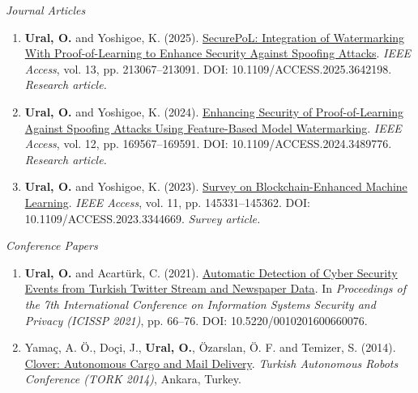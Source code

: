 \documentclass[10pt,a4paper]{article}
\newcommand{\cvsub}[1]{\par\needspace{3\baselineskip}\vspace{0.2em}\textit{#1}\par}
\begin{document}
\cvsub{Journal Articles}
\begin{enumerate}
  \item[{[J3]}] \textbf{Ural, O.} and Yoshigoe, K. (2025). \href{https://doi.org/10.1109/ACCESS.2025.3642198}{SecurePoL: Integration of Watermarking With Proof-of-Learning to Enhance Security Against Spoofing Attacks}. \textit{IEEE Access}, vol. 13, pp. 213067--213091. DOI: 10.1109/ACCESS.2025.3642198. \textit{Research article.}   
  \item[{[J2]}] \textbf{Ural, O.} and Yoshigoe, K. (2024). \href{https://doi.org/10.1109/ACCESS.2024.3489776}{Enhancing Security of Proof-of-Learning Against Spoofing Attacks Using Feature-Based Model Watermarking}. \textit{IEEE Access}, vol. 12, pp. 169567--169591. DOI: 10.1109/ACCESS.2024.3489776. \textit{Research article.} 
  \item[{[J1]}] \textbf{Ural, O.} and Yoshigoe, K. (2023). \href{https://doi.org/10.1109/ACCESS.2023.3344669}{Survey on Blockchain-Enhanced Machine Learning}. \textit{IEEE Access}, vol. 11, pp. 145331--145362. DOI: 10.1109/ACCESS.2023.3344669. \textit{Survey article.}  
\end{enumerate}

\cvsub{Conference Papers}
\begin{enumerate}
  \item[{[C2]}] \textbf{Ural, O.} and Acart\"urk, C. (2021). \href{https://doi.org/10.5220/0010201600660076}{Automatic Detection of Cyber Security Events from Turkish Twitter Stream and Newspaper Data}. In \textit{Proceedings of the 7th International Conference on Information Systems Security and Privacy (ICISSP 2021)}, pp. 66--76. DOI: 10.5220/0010201600660076.  
  \item[{[C1]}] Yama\c{c}, A. \"O., Do\c{c}i, J., \textbf{Ural, O.}, \"Ozarslan, \"O. F. and Temizer, S. (2014). \href{https://senior.ceng.metu.edu.tr/2014/clover/}{Clover: Autonomous Cargo and Mail Delivery}. \textit{Turkish Autonomous Robots Conference (TORK 2014)}, Ankara, Turkey. 
\end{enumerate}
\end{document}
